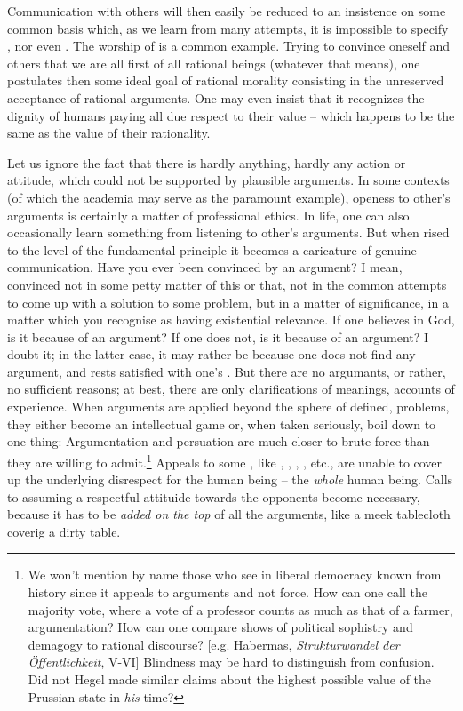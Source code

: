 {\subpa
Communication with others will then easily be reduced to an 
insistence on some  common basis which, as we learn 
from many attempts, it is impossible to specify , nor 
even . The 
worship of  is a common example. Trying to 
convince oneself and others that we are all first of all rational 
beings (whatever that means), one postulates then some ideal goal of 
rational morality consisting in the unreserved acceptance of rational 
arguments. One may even insist that it 
recognizes the dignity of humans paying all due respect to their 
value -- which happens to be the same as the value of their rationality.

Let us ignore the fact that there is hardly anything, hardly any
action or attitude, which could not be supported by plausible
arguments.  In some contexts (of which the academia may serve as the
paramount example), openess to other's arguments is certainly a matter
of professional ethics.  In life, one can also occasionally learn
something from listening to other's arguments.  But when rised to the
level of the fundamental principle it becomes a caricature of genuine
communication.  Have you ever been convinced by an argument?  I mean,
convinced not in some petty matter of this or that, not in the common
attempts to come up with a solution to some problem, but in a matter
of significance, in a matter which you recognise as having existential
relevance.  If one believes in God, is it because of an argument?  If
one does not, is it because of an argument?  I doubt it; in the latter
case, it may rather be because one does not find any argument, and
rests satisfied with one's .  But there are no
argumants, or rather, no sufficient reasons; at best, there are only
clarifications of meanings, accounts of experience.  When arguments
are applied beyond the sphere of  defined, 
problems, they either become an intellectual game or, when taken
seriously, boil down to one thing:  Argumentation and persuation are much closer to brute
force than they are willing to admit.\footnote{We won't mention by
name those who see in liberal democracy  known from history since it appeals to arguments and
not force.  How can one call the majority vote, where a vote of a
professor counts as much as that of a farmer, argumentation? How can 
one compare shows of political sophistry and demagogy to rational discourse?
[e.g. Habermas, {\em Strukturwandel der \"{O}ffentlichkeit}, V-VI] Blindness may be hard to distinguish from confusion.  Did not Hegel
made similar claims about the highest possible value of the Prussian
state in {\em his} time?}
%
Appeals to some , like , , , , etc., are unable
to cover up the underlying disrespect for the human being -- the {\em
whole} human being.  Calls to assuming a respectful attituide towards
the opponents become necessary, because it has to be {\em added on the
top} of all the arguments, like a meek tablecloth coverig a dirty
table.

}
